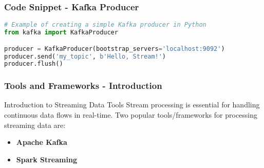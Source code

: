 \documentclass[aspectratio=169]{beamer}
\begin{document}
\begin{frame}[fragile]
    \frametitle{Code Snippet - Kafka Producer}
    \begin{lstlisting}[language=Python]
# Example of creating a simple Kafka producer in Python
from kafka import KafkaProducer

producer = KafkaProducer(bootstrap_servers='localhost:9092')
producer.send('my_topic', b'Hello, Stream!')
producer.flush()
    \end{lstlisting}
\end{frame}

\begin{frame}
    \frametitle{Tools and Frameworks - Introduction}
    \begin{block}{Introduction to Streaming Data Tools}
        Stream processing is essential for handling continuous data flows in real-time. Two popular tools/frameworks for processing streaming data are:
        \begin{itemize}
            \item \textbf{Apache Kafka}
            \item \textbf{Spark Streaming}
        \end{itemize}
    \end{block}
\end{frame}
\end{document}
